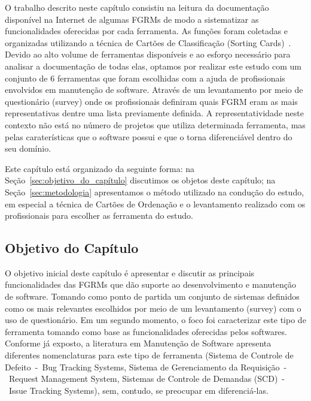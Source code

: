 O trabalho descrito neste capítulo consistiu na leitura da documentação
disponível na Internet de algumas FGRMs de modo a sistematizar as
funcionalidades o\-fe\-re\-ci\-das por cada ferramenta. As funções foram
coletadas e organizadas utilizando a técnica de Cartões de Classificação
(Sorting Cards)~\cite{5070993, rugg2005sorting}. Devido ao alto volume de
ferramentas disponíveis e ao esforço necessário para analisar a documentação de
todas elas, optamos por realizar este estudo com um conjunto de 6 ferramentas
que foram escolhidas com a ajuda de profissionais envolvidos em manutenção de
software. Através de um levantamento por meio de questionário (survey) onde os
profissionais definiram quais FGRM eram as mais representativas dentre uma lista
previamente definida. A representatividade neste contexto não está no número de
projetos que utiliza determinada ferramenta, mas pelas caraterísticas que o
software possui e que o torna diferenciável dentro do seu domínio.


Este capítulo está organizado da seguinte forma: na
Seção~\ref{sec:objetivo_do_capítulo} discutimos os objetos deste capítulo; na
Seção~\ref{sec:metodologia} apresentamos o método utilizado na condução do
estudo, em especial a técnica de Cartões de Ordenação e o levantamento realizado
com os profissionais para escolher as ferramenta do estudo.

\todoend{}

\subsection{Objetivo do Capítulo}
\label{subsec:caracterizacao_objetivo_do_capitulo}

O objetivo inicial deste capítulo é apresentar e discutir as principais
funcionalidades das FGRMs que dão suporte ao desenvolvimento e manutenção de
software. Tomando como ponto de partida um conjunto de sistemas definidos como
os mais relevantes escolhidos por meio de um levantamento (survey) com o uso de
questionário. Em um segundo momento, o foco foi caracterizar este tipo de
ferramenta tomando como base as funcionalidades oferecidas pelos softwares.
Conforme já exposto, a literatura em Manutenção de Software apresenta diferentes
nomenclaturas para este tipo de ferramenta (Sistema de Controle de Defeito~-~Bug
Tracking Systems, Sistema de Gerenciamento da Requisição~-~Request Management
System, Sistemas de Controle de Demandas (SCD)~-~Issue Tracking Systems), sem,
contudo, se preocupar em diferenciá-las.

